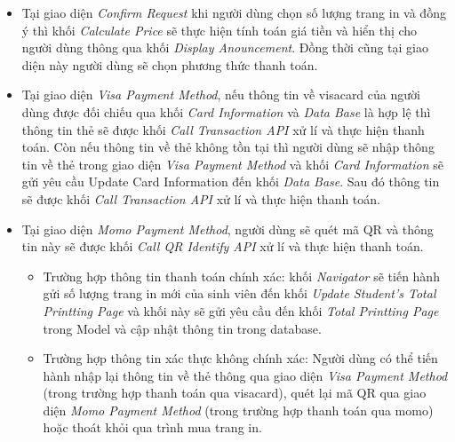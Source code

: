         \begin{itemize}
            \item Tại giao diện \textit{Confirm Request} khi người dùng chọn số lượng trang in và đồng ý thì khối \textit{Calculate Price} sẽ thực hiện tính toán giá tiền và hiển thị cho người dùng thông qua khối \textit{Display Anouncement}. Đồng thời cũng tại giao diện này người dùng sẽ chọn phương thức thanh toán.
            \item Tại giao diện \textit{Visa Payment Method}, nếu thông tin về visacard của người dùng được đối chiếu qua khối \textit{Card Information} và \textit{Data Base} là hợp lệ thì thông tin thẻ sẽ được khối \textit{Call Transaction API} xử lí và thực hiện thanh toán. Còn nếu thông tin về thẻ không tồn tại thì người dùng sẽ nhập thông tin về thẻ trong giao diện \textit{Visa Payment Method} và khối \textit{Card Information} sẽ gửi yêu cầu Update Card Information đến khối \textit{Data Base}. Sau đó thông tin sẽ được khối \textit{Call Transaction API} xử lí và thực hiện thanh toán.
            \item Tại giao diện \textit{Momo Payment Method}, người dùng sẽ quét mã QR và thông tin này sẽ được khối \textit{Call QR Identify API} xử lí và thực hiện thanh toán.
            \begin{itemize}
                \item Trường hợp thông tin thanh toán chính xác: khối \textit{Navigator} sẽ tiến hành gửi số lượng trang in mới của sinh viên đến khối \textit{Update Student's Total Printting Page } và khối này sẽ gửi yêu cầu đến khối \textit{Total Printting Page} trong Model và cập nhật thông tin trong database.
                \item Trường hợp thông tin xác thực không chính xác: Người dùng có thể tiến hành nhập lại thông tin về thẻ thông qua giao diện \textit{Visa Payment Method} (trong trường hợp thanh toán qua visacard), quét lại mã QR qua giao diện \textit{Momo Payment Method} (trong trường hợp thanh toán qua momo) hoặc thoát khỏi qua trình mua trang in.    
            \end{itemize}
        \end{itemize}


        \newpage
